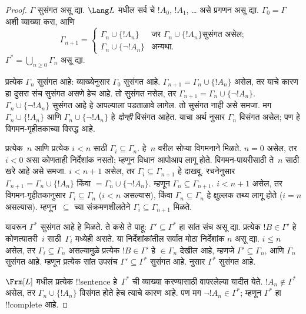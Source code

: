 \documentclass[../../../include/open-logic-section]{subfiles}
\begin{document}
\begin{proof}
$\Gamma$ सुसंगत असू द्या. $\Lang L$ मधील सर्व चे
$!A_0$, $!A_1$, \dots{} असे प्रगणन असू द्या. $\Gamma_0 = \Gamma$
अशी व्याख्या करा, आणि
\[
\Gamma_{n+1} =
\begin{cases}
\Gamma_n \cup \{ !A_n \} & \textrm{जर $\Gamma_n \cup \{!A_n\}$
  सुसंगत असेल;} \\
\Gamma_n \cup \{ \lnot !A_n \} & \textrm{अन्यथा.}
\end{cases}
\]
$\Gamma^* = \bigcup_{n \geq 0} \Gamma_n$ असू द्या.

प्रत्येक $\Gamma_n$ सुसंगत आहे: व्याख्येनुसार $\Gamma_0$ सुसंगत आहे.
$\Gamma_{n+1} = \Gamma_n \cup \{!A_n\}$ असेल, तर याचे कारण हा
दुसरा संच सुसंगत असणे हेच आहे. तो सुसंगत नसेल, तर $\Gamma_{n+1} =
\Gamma_n \cup \{\lnot !A_n\}$. $\Gamma_n \cup \{\lnot !A_n\}$
सुसंगत आहे हे आपल्याला पडताळावे लागेल. तो सुसंगत नाही असे समजा. मग
$\Gamma_n \cup \{!A_n\}$ आणि $\Gamma_n \cup \{\lnot !A_n\}$ हे
\emph{दोन्ही} विसंगत आहेत. याचा अर्थ
नुसार $\Gamma_n$ विसंगत असेल; पण हे विगमन-गृहीतकाच्या विरुद्ध आहे.

प्रत्येक~$n$ आणि प्रत्येक $i < n$ साठी $\Gamma_i \subseteq \Gamma_n$.
हे~$n$ वरील सोप्या विगमनाने मिळते. $n=0$ असेल, तर $i < 0$ असा
कोणताही निर्देशांक नसतो; म्हणून विधान आपोआप लागू होते. विगमन-पायरीसाठी ते~$n$
साठी खरे आहे असे समजा. $i < n+1$ असेल, तर $\Gamma_i \subseteq
\Gamma_{n+1}$ हे दाखवू. रचनेनुसार $\Gamma_{n+1} = \Gamma_n \cup
\{!A_n\}$ किंवा $= \Gamma_n \cup \{\lnot !A_n\}$. म्हणून $\Gamma_n
\subseteq \Gamma_{n+1}$. $i < n+1$ असेल, तर विगमन-गृहीतकानुसार
$\Gamma_i \subseteq \Gamma_n$ ($i < n$ असल्यास), किंवा $\Gamma_n
\subseteq \Gamma_n$ हे क्षुल्लक तथ्य लागू होते ($i = n$ असल्यास).
म्हणून~$\subseteq$ च्या संक्रमणशीलतेने $\Gamma_i \subseteq
\Gamma_{n+1}$ मिळते.

यावरून $\Gamma^*$ सुसंगत आहे हे मिळते. ते कसे ते पाहू: $\Gamma'
\subseteq \Gamma^*$ हा सांत संच असू द्या. प्रत्येक $!B \in \Gamma'$
हे कोणत्यातरी~$i$ साठी~$\Gamma_i$ मध्येही असते. या निर्देशांकांतील
सर्वांत मोठा निर्देशांक $n$ असू द्या. $i \le n$ असेल, तर $\Gamma_i
\subseteq \Gamma_n$ असल्यामुळे प्रत्येक $!B \in \Gamma'$ हे
$\in \Gamma_n$ देखील आहे, म्हणजे $\Gamma' \subseteq \Gamma_n$, आणि
$\Gamma_n$ सुसंगत आहे. म्हणून प्रत्येक सांत उपसंच $\Gamma' \subseteq
\Gamma^*$ सुसंगत आहे.
 नुसार $\Gamma^*$
सुसंगत आहे.

$\Frm[L]$ मधील प्रत्येक !!{sentence} हे~$\Gamma^*$ ची व्याख्या
करण्यासाठी वापरलेल्या यादीत येते. $!A_n \notin \Gamma^*$ असेल, तर
$\Gamma_n \cup \{!A_n\}$ विसंगत होते हेच त्याचे कारण आहे. पण मग
$\lnot !A_n \in \Gamma^*$; म्हणून $\Gamma^*$ हा !!{complete} आहे.
\end{proof}
\end{document}

